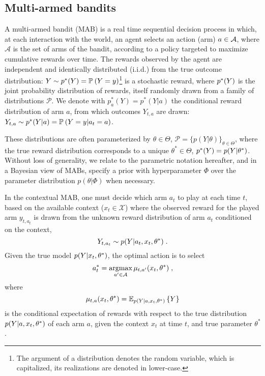 \subsection{Multi-armed bandits}
\label{ssec:background_mab}

A multi-armed bandit (MAB) is a real time sequential decision process in which, at each interaction with the world, an agent selects an action (\ie arm) $a\in \mathcal{A}$, where $\mathcal{A}$ is the set of arms of the bandit, according to a policy targeted to maximize cumulative rewards over time.
The rewards observed by the agent are independent and identically distributed (i.i.d.) from the true outcome distribution:
$Y \sim p^*(Y)=\mathbb{P}_{}\left( Y=y \right)$\footnote{The argument of a distribution denotes the random variable, which is capitalized, its realizations are denoted in lower-case.} is a stochastic reward, where $p^*(Y)$ is the joint probability distribution of rewards, itself randomly drawn from a family of distributions $\mathcal{P}$.
We denote with $p_a^*(Y)=p^*(Y|a)$ the conditional reward distribution of arm $a$, from which outcomes $Y_{t,a}$ are drawn: $Y_{t,a}\sim p^*(Y|a)=\mathbb{P}_{}\left( Y=y|a_t=a \right)$.

These distributions are often parameterized by $\theta \in \Theta$, \ie $\mathcal{P}=\{p(Y|\theta)\}_{\theta \in \Theta}$, where the true reward distribution corresponds to a unique $\theta^* \in \Theta$, \ie $p^*(Y)=p(Y|\theta^*)$. Without loss of generality, we relate to the parametric notation hereafter, and in a Bayesian view of MABs, specify a prior with hyperparameter $\varPhi$ over the parameter distribution $p(\theta|\varPhi)$ when necessary.

In the contextual MAB, one must decide which arm $a_{t}$ to play at each time $t$, based on the available context (\ie $x_{t}\in\mathcal{X}$) where the observed reward for the played arm $y_{t,a_{t}}$ is drawn from the unknown reward distribution of arm $a_t$ conditioned on the context,
\begin{equation}
Y_{t,a_t}\sim p(Y|a_t,x_t,\theta^*) \; .
\end{equation}
Given the true model $p(Y|x_t,\theta^*)$, the optimal action is to select
\begin{equation}
a_t^* = \mathop{\mathrm{argmax}}_{a^\prime \in \mathcal{A}} \mu_{t,a^\prime}(x_t,\theta^*) \;,
\end{equation}
where
\begin{equation}
\mu_{t,a}(x_t,\theta^*)=\mathbb{E}_{p(Y|a,x_t,\theta^*)}\left\{ Y \right\}
\end{equation}
is the conditional expectation of rewards with respect to the true distribution $p(Y|a,x_t,\theta^*)$ of each arm $a$, given the context $x_t$ at time $t$, and true parameter $\theta^*$.

